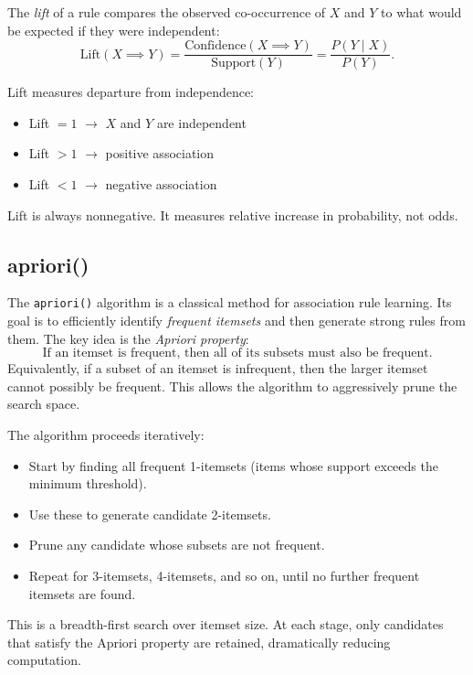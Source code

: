 \medskip

The \emph{lift} of a rule compares the observed co-occurrence of $X$ and $Y$ to what would be expected if they were independent:
\[
\text{Lift}(X \implies Y)
=
\frac{\text{Confidence}(X \implies Y)}{\text{Support}(Y)}
=
\frac{P(Y \mid X)}{P(Y)}.
\]

Lift measures departure from independence:
\begin{itemize}
    \item Lift $= 1$ $\longrightarrow$ $X$ and $Y$ are independent
    \item Lift $> 1$ $\longrightarrow$ positive association
    \item Lift $< 1$ $\longrightarrow$ negative association
\end{itemize}

Lift is always nonnegative. It measures relative increase in probability, not odds.

\bigskip

\subsection{apriori()}

\medskip

The \texttt{apriori()} algorithm is a classical method for association rule learning. Its goal is to efficiently identify \emph{frequent itemsets} and then generate strong rules from them. The key idea is the \textit{Apriori property}:
\[
\text{If an itemset is frequent, then all of its subsets must also be frequent.}
\]
Equivalently, if a subset of an itemset is infrequent, then the larger itemset cannot possibly be frequent. This allows the algorithm to aggressively prune the search space.

\medskip

The algorithm proceeds iteratively:
\begin{itemize}
    \item Start by finding all frequent 1-itemsets (items whose support exceeds the minimum threshold).
    \item Use these to generate candidate 2-itemsets.
    \item Prune any candidate whose subsets are not frequent.
    \item Repeat for 3-itemsets, 4-itemsets, and so on, until no further frequent itemsets are found.
\end{itemize}

This is a breadth-first search over itemset size. At each stage, only candidates that satisfy the Apriori property are retained, dramatically reducing computation.

